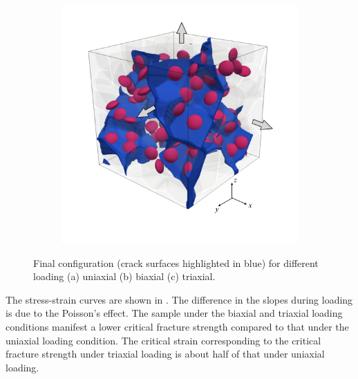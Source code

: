 \begin{figure}[!htb]
\begin{subfigure}{0.32\textwidth}
    \caption{}
    \label{b100_load2}
  \end{subfigure}
  \begin{subfigure}{0.32\textwidth}
    \centering
    \includegraphics[width=\textwidth]{Chapter3/figures/b100_end_xyz}
    \caption{}
    \label{b100_load3}
  \end{subfigure}
  \caption{ Final configuration (crack surfaces highlighted in blue) for different loading (a) uniaxial (b) biaxial (c) triaxial.}
  \label{final_loading}
\end{figure}

The stress-strain curves are shown in . The difference in the slopes during loading is due to the Poisson's effect. The sample under the biaxial and triaxial loading conditions manifest a lower critical fracture strength compared to that under the uniaxial loading condition. The critical strain corresponding to the critical fracture strength under triaxial loading is about half of that under uniaxial loading.

